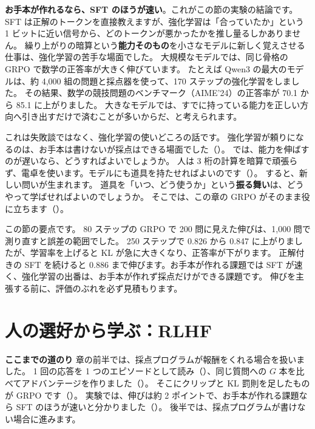 \textbf{お手本が作れるなら、SFT のほうが速い}。これがこの節の実験の結論です。
SFT は正解のトークンを直接教えますが、強化学習は「合っていたか」という 1 ビットに近い信号から、どのトークンが悪かったかを推し量るしかありません。
繰り上がりの暗算という\textbf{能力そのもの}を小さなモデルに新しく覚えさせる仕事は、強化学習の苦手な場面でした。
大規模なモデルでは、同じ骨格の GRPO で数学の正答率が大きく伸びています。
たとえば Qwen3 の最大のモデルは、約 4,000 組の問題と採点器を使って、170 ステップの強化学習をしました。
その結果、数学の競技問題のベンチマーク（AIME'24）の正答率が 70.1 から 85.1 に上がりました\cite{yang2025qwen3}。
大きなモデルでは、すでに持っている能力を正しい方向へ引き出すだけで済むことが多いからだ、と考えられます。

これは失敗談ではなく、強化学習の使いどころの話です。
強化学習が頼りになるのは、お手本は書けないが採点はできる場面でした（）。
では、能力を伸ばすのが遅いなら、どうすればよいでしょうか。
人は 3 桁の計算を暗算で頑張らず、電卓を使います。モデルにも道具を持たせればよいのです（）。
すると、新しい問いが生まれます。
道具を「いつ、どう使うか」という\textbf{振る舞い}は、どうやって学ばせればよいのでしょうか。
そこでは、この章の GRPO がそのまま役に立ちます（）。

この節の要点です。
80 ステップの GRPO で 200 問に見えた伸びは、1,000 問で測り直すと誤差の範囲でした。
250 ステップで 0.826 から 0.847 に上がりましたが、学習率を上げると KL が急に大きくなり、正答率が下がります。
正解付きの SFT を続けると 0.886 まで伸びます。お手本が作れる課題では SFT が速く、強化学習の出番は、お手本が作れず採点だけができる課題です。
伸びを主張する前に、評価のぶれを必ず見積もります。

\section{人の選好から学ぶ：RLHF}\label{sec:rl-rlhf}

\textbf{ここまでの道のり}\quad
章の前半では、採点プログラムが報酬をくれる場合を扱いました。
1 回の応答を 1 つのエピソードとして読み（）、同じ質問への $G$ 本を比べてアドバンテージを作りました（）。
そこにクリップと KL 罰則を足したものが GRPO です（）。
実験では、伸びは約 2 ポイントで、お手本が作れる課題なら SFT のほうが速いと分かりました（）。
後半では、採点プログラムが書けない場合に進みます。

